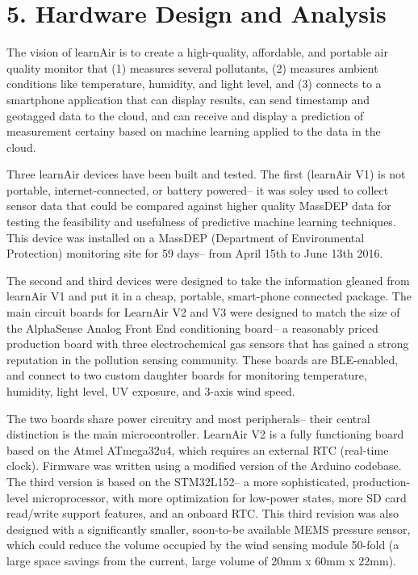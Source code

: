 \chapter{5. Hardware Design and Analysis}

The vision of learnAir is to create a high-quality, affordable, and portable air quality monitor that (1) measures several pollutants, (2) measures ambient conditions like temperature, humidity, and light level, and (3) connects to a smartphone application that can display results, can send timestamp and geotagged data to the cloud, and can receive and display a prediction of measurement certainy based on machine learning applied to the data in the cloud.

Three learnAir devices have been built and tested.  The first (learnAir V1) is not portable, internet-connected, or battery powered-- it was soley used to collect sensor data that could be compared against higher quality MassDEP data for testing the feasibility and usefulness of predictive machine learning techniques.  This device was installed on a MassDEP (Department of Environmental Protection) monitoring site for 59 days-- from April 15th to June 13th 2016.

The second and third devices were designed to take the information gleaned from learnAir V1 and put it in a cheap, portable, smart-phone connected package.  The main circuit boards for LearnAir V2 and V3 were designed to match the size of the AlphaSense Analog Front End conditioning board-- a reasonably priced production board with three electrochemical gas sensors that has gained a strong reputation in the pollution sensing community.  These boards are BLE-enabled, and connect to two custom daughter boards for monitoring temperature, humidity, light level, UV exposure, and 3-axis wind speed.   

The two boards share power circuitry and most peripherals-- their central distinction is the main microcontroller.  LearnAir V2 is a fully functioning board based on the Atmel ATmega32u4, which requires an external RTC (real-time clock).  Firmware was written using a modified version of the Arduino codebase.  The third version is based on the STM32L152-- a more sophisticated, production-level microprocessor, with more optimization for low-power states, more SD card read/write support features, and an onboard RTC.  This third revision was also designed with a significantly smaller, soon-to-be available MEMS pressure sensor, which could reduce the volume occupied by the wind sensing module 50-fold (a large space savings from the current, large volume of 20mm x 60mm x 22mm).
     
